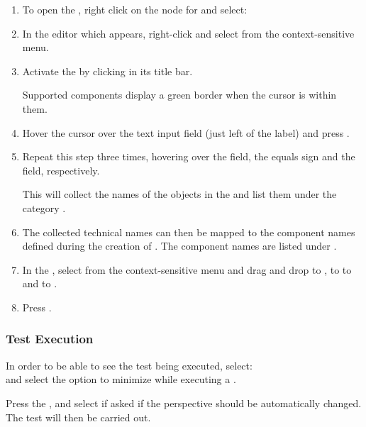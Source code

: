 \begin{enumerate}
\item To open the \gdomeditor{}, right click on the node for 
and select:\\
\item In the editor which appears, 
right-click and select   from the 
context-sensitive menu. 
\item Activate the 
\gdaut{} by clicking in its title bar. 

Supported components display a green border when the cursor
is within them.
\item Hover the cursor over the  text input field 
(just left of the  label) and press
. 
\item Repeat this step three times, hovering over the 
 field, the equals sign and the  field,
respectively. 

This will collect the names of the objects in the \gdaut{} and
list them under the category .
\item The collected technical 
names can then be mapped to the component names defined
during the creation of \gdsteps{}. The component names are listed under 
.  
\item In
 the \gdomeditor{}, select   from
 the context-sensitive menu
 and drag and drop  to , 
 to  
 to  and  to
 . 
 \item Press . 
\end{enumerate}

\subsubsection{Test Execution}
In order to be able to see the test being executed, select: \\ 
 and select the option to minimize \GD while executing a \gdsuite{}.

Press the , and select 
if asked if the perspective should be automatically changed. 
The test will then be carried out.

